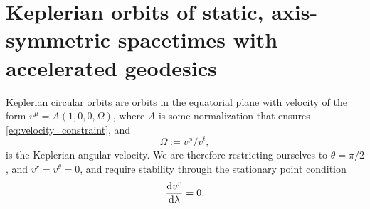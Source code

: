 \section{Keplerian orbits of static, axis-symmetric spacetimes with accelerated geodesics}
\label{appendix:circular-orbits}

Keplerian circular orbits are orbits in the equatorial plane with velocity of the form $v^\mu = A(1, 0, 0, \Omega)$, where $A$ is some normalization that ensures \eqref{eq:velocity_constraint}, and 
\begin{equation}
    \label{eq:keplerian-angular-velocity}
    \Omega := v^\phi / v^t,
\end{equation} 
is the Keplerian angular velocity. We are therefore restricting ourselves to $\theta = \pi/2$, and $v^r = v^\theta = 0$, and require stability through the stationary point condition 
\begin{equation}
    \frac{\text{d} v^r}{\text{d} \lambda} = 0.
\end{equation}

